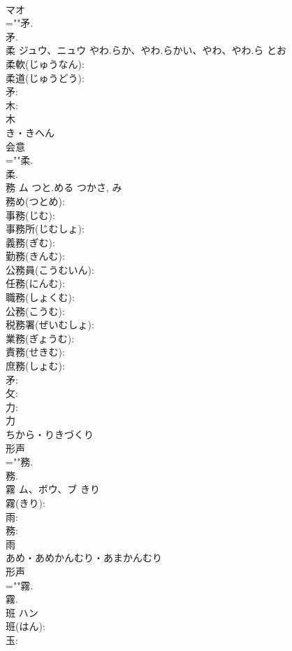 \documentclass[8pt]{extreport}
\begin{document}
\begin{CJK}{UTF8}{min}
\\	マオ 
\\	=""矛.
\\	矛.
\\	柔	ジュウ、ニュウ	やわ.らか、やわ.らかい、やわ、やわ.ら	とお	
\\	柔軟(じゅうなん): 
\\	柔道(じゅうどう): 
\\	矛: 
\\	木: 
\\	木	
\\	き・きへん	
\\	会意 
\\	=""柔.
\\	柔.
\\	務	ム	つと.める	つかさ, み	
\\	務め(つとめ): 
\\	事務(じむ): 
\\	事務所(じむしょ): 
\\	義務(ぎむ): 
\\	勤務(きんむ): 
\\	公務員(こうむいん): 
\\	任務(にんむ): 
\\	職務(しょくむ): 
\\	公務(こうむ): 
\\	税務署(ぜいむしょ): 
\\	業務(ぎょうむ): 
\\	責務(せきむ): 
\\	庶務(しょむ): 
\\	矛: 
\\	攵: 
\\	力: 
\\	力	
\\	ちから・りきづくり	
\\	形声 
\\	=""務.
\\	務.
\\	霧	ム、ボウ、ブ	きり		
\\	霧(きり): 
\\	雨: 
\\	務: 
\\	雨	
\\	あめ・あめかんむり・あまかんむり	
\\	形声 
\\	=""霧.
\\	霧.
\\	班	ハン			
\\	班(はん): 
\\	玉: 

\end{CJK}
\end{document}
